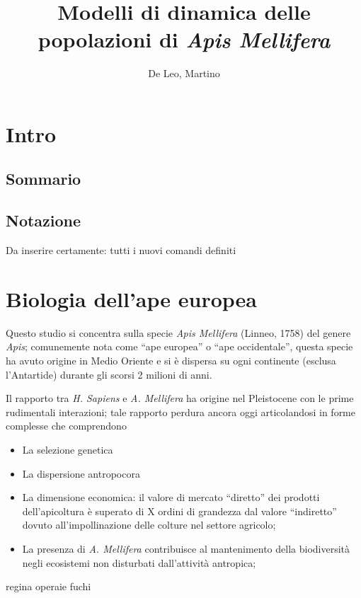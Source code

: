 \documentclass[11pt,a4paper]{book} %
\author{De Leo, Martino}
\title{Modelli di dinamica delle popolazioni di \emph{Apis Mellifera}}
\begin{document}
\maketitle %

\frontmatter

\chapter{Intro}
\section*{Sommario}


\section*{Notazione}
Da inserire certamente: tutti i nuovi comandi definiti


\tableofcontents

\chapter{Biologia dell'ape europea}
Questo studio si concentra sulla specie \emph{Apis Mellifera} (Linneo, 1758) del genere \emph{Apis};
comunemente nota come ``ape europea'' o ``ape occidentale'', questa specie ha avuto origine in Medio Oriente e si è dispersa su ogni continente (esclusa l'Antartide) durante gli scorsi 2 milioni di anni.

Il rapporto tra \emph{H. Sapiens} e \emph{A. Mellifera} ha origine nel Pleistocene con le prime rudimentali interazioni;
tale rapporto perdura ancora oggi articolandosi in forme complesse che comprendono
\begin{itemize}
    \item La selezione genetica
    \item La dispersione antropocora
    \item La dimensione economica: il valore di mercato ``diretto'' dei prodotti dell'apicoltura è superato di X ordini di grandezza dal valore ``indiretto'' dovuto all'impollinazione delle colture nel settore agricolo;
    \item La presenza di \emph{A. Mellifera} contribuisce al mantenimento della biodiversità negli ecosistemi non disturbati dall'attività antropica;
\end{itemize}

regina operaie fuchi
\end{document}
